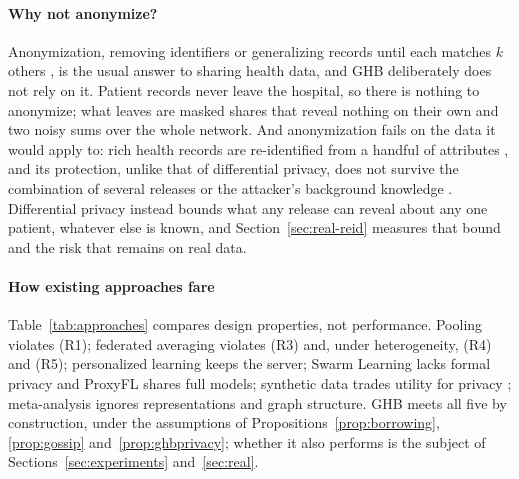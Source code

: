 \documentclass[acmsmall,screen,review]{acmart}
\theoremstyle{acmdefinition}
\begin{document}
\paragraph{Why not anonymize?} Anonymization, removing identifiers or generalizing records until each matches $k$ others \cite{sweeney2002k}, is the usual answer to sharing health data, and GHB deliberately does not rely on it. Patient records never leave the hospital, so there is nothing to anonymize; what leaves are masked shares that reveal nothing on their own and two noisy sums over the whole network. And anonymization fails on the data it would apply to: rich health records are re-identified from a handful of attributes \cite{rocher2019estimating}, and its protection, unlike that of differential privacy, does not survive the combination of several releases or the attacker's background knowledge \cite{dwork2014algorithmic,ganta2008composition}. Differential privacy instead bounds what any release can reveal about any one patient, whatever else is known, and Section~\ref{sec:real-reid} measures that bound and the risk that remains on real data.

\paragraph{How existing approaches fare} Table~\ref{tab:approaches} compares design properties, not performance. Pooling violates (R1); federated averaging \cite{mcmahan2017communication} violates (R3) and, under heterogeneity, (R4) and (R5); personalized learning keeps the server; Swarm Learning \cite{warnatherresthal2021swarm} lacks formal privacy and ProxyFL \cite{kalra2023decentralized} shares full models; synthetic data trades utility for privacy \cite{jordon2019pate,stadler2022synthetic}; meta-analysis ignores representations and graph structure. GHB meets all five by construction, under the assumptions of Propositions~\ref{prop:borrowing}, \ref{prop:gossip} and~\ref{prop:ghbprivacy}; whether it also performs is the subject of Sections~\ref{sec:experiments} and~\ref{sec:real}.
\end{document}
